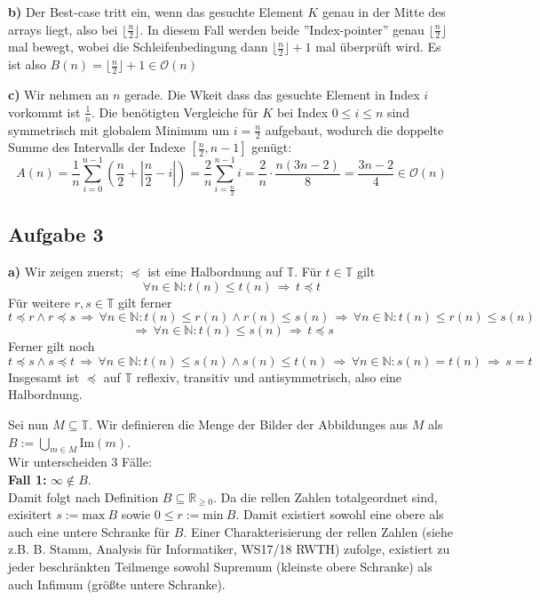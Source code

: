 \documentclass[a4paper,graphics,11pt]{article}
\newcommand{\aufgabe}[1]{\subsection*{Aufgabe #1}}
\begin{document}
\textbf{b)}
Der Best-case tritt ein, wenn das gesuchte Element $K$ genau in der Mitte des arrays liegt, also
bei $\lfloor\frac{n}{2}\rfloor$. In diesem Fall werden beide
''Index-pointer'' genau $\lfloor\frac{n}{2}\rfloor$ mal bewegt, wobei die Schleifenbedingung
dann $\lfloor\frac{n}{2}\rfloor + 1$ mal überprüft wird.
Es ist also $B(n) = \lfloor\frac{n}{2}\rfloor + 1 \in \mathcal{O}(n)$

\textbf{c)} 
Wir nehmen an $n$ gerade. Die Wkeit dass das gesuchte Element in Index $i$ vorkommt ist $\frac{1}{n}$.
Die benötigten Vergleiche für $K$ bei Index $0\leq i \leq n$
sind symmetrisch mit globalem Minimum um $i = \frac{n}{2}$ aufgebaut, wodurch die doppelte Summe des
Intervalls der Indexe $[\frac{n}{2}, n-1]$ genügt:
$$
    A(n)
    = \frac{1}{n} \sum_{i=0}^{n-1}\left( \frac{n}{2} + \left|\frac{n}{2} -i\right|\right)
    = \frac{2}{n} \sum_{i=\frac{n}{2}}^{n-1} i
    = \frac{2}{n} \cdot \frac{n(3n-2)}{8}
    = \frac{3n-2}{4} \in \mathcal{O}(n)
$$

\newpage
\aufgabe{3}
\textbf{a)}
Wir zeigen zuerst; $\preceq$ ist eine Halbordnung auf $\mathbb{T}$.
Für $t \in \mathbb{T}$ gilt
$$
    \forall n \in \mathbb{N} : t(n) \leq t(n) \,\Longrightarrow\, t \preceq t
$$
Für weitere $r,s \in \mathbb{T}$ gilt ferner
$$
    t \preceq r \land r \preceq s
    \,\Longrightarrow\,
    \forall n \in \mathbb{N} : t(n) \leq r(n) \land r(n) \leq s(n)
    \,\Longrightarrow\, \forall n \in \mathbb{N} : t(n) \leq r(n) \leq s(n)
$$$$
    \,\Longrightarrow\, \forall n \in \mathbb{N} : t(n) \leq s(n)
    \,\Longrightarrow\, t \preceq s
$$
Ferner gilt noch
$$
    t \preceq s \land s \preceq t
    \,\Longrightarrow\, \forall n \in\mathbb{N} : t(n) \leq s(n) \land s(n) \leq t(n)
    \,\Longrightarrow\, \forall n \in\mathbb{N} : s(n) = t(n)
    \,\Longrightarrow\, s = t
$$
Insgesamt ist $\preceq$ auf $\mathbb{T}$ reflexiv, transitiv und antisymmetrisch, also eine Halbordnung.
 
Sei nun $M \subseteq \mathbb{T}$. Wir definieren die Menge der Bilder der Abbildunges aus $M$ als
$B := \bigcup_{m \in M} \text{Im}(m)$.\\
Wir unterscheiden 3 Fälle:\\
\textbf{Fall 1:} $\infty \notin B$.\\
Damit folgt nach Definition $B \subseteq \mathbb{R}_{\geq 0}$.
Da die rellen Zahlen totalgeordnet sind, exisitert $s := \text{max}\ B$ sowie $0 \leq r := \text{min}\ B$.
Damit existiert sowohl eine obere als auch eine untere Schranke für $B$.
Einer Charakterisierung der rellen Zahlen (siehe z.B. B. Stamm, Analysis für Informatiker, WS17/18 RWTH)
zufolge, existiert zu jeder beschränkten Teilmenge sowohl Supremum (kleinste obere Schranke) als auch Infimum
(größte untere Schranke).
\end{document}
